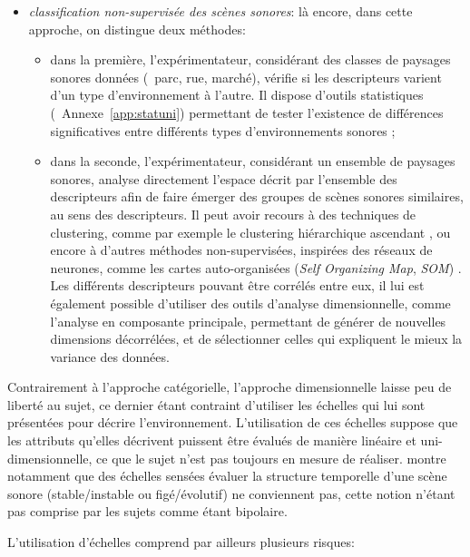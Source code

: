\begin{itemize}
\item \emph{classification non-supervisée des scènes sonores}: là encore, dans cette approche, on distingue deux méthodes:

\begin{itemize}
\item dans la première, l'expérimentateur, considérant des classes de paysages sonores données (\eg~parc, rue, marché), vérifie si les descripteurs varient d'un type d'environnement à l'autre. Il dispose d'outils statistiques (\cf~Annexe~\ref{app:statuni}) permettant de tester l'existence de différences significatives entre différents types d'environnements sonores \citep{hong2013designing};
\item dans la seconde, l'expérimentateur, considérant un ensemble de paysages sonores, analyse directement l'espace décrit par l'ensemble des descripteurs afin de faire émerger des groupes de scènes sonores similaires, au sens des descripteurs. Il peut avoir recours à des techniques de clustering, comme par exemple le clustering hiérarchique ascendant \citep{torija2013application}, ou encore à d'autres méthodes non-supervisées, inspirées des réseaux de neurones, comme les cartes auto-organisées (\emph{Self Organizing Map}, \emph{SOM}) \citep{ricciardi2015sound}. Les différents descripteurs pouvant être corrélés entre eux, il lui est également possible d'utiliser des outils d'analyse dimensionnelle, comme l'analyse en composante principale, permettant de générer de nouvelles dimensions décorrélées, et de sélectionner celles qui expliquent le mieux la variance des données.
\end{itemize}

\end{itemize}

Contrairement à l'approche catégorielle, l'approche dimensionnelle laisse peu de liberté au sujet, ce dernier étant contraint d'utiliser les échelles qui lui sont présentées pour décrire l'environnement. L'utilisation de ces échelles suppose que les attributs qu'elles décrivent puissent être évalués de manière linéaire et uni-dimensionnelle, ce que le sujet n'est pas toujours en mesure de réaliser. \citep{raimbault2006qualitative} montre notamment que des échelles sensées évaluer la structure temporelle d'une scène sonore (stable/instable ou figé/évolutif) ne conviennent pas, cette notion n'étant pas comprise par les sujets comme étant bipolaire.

L'utilisation d'échelles comprend par ailleurs plusieurs risques:

